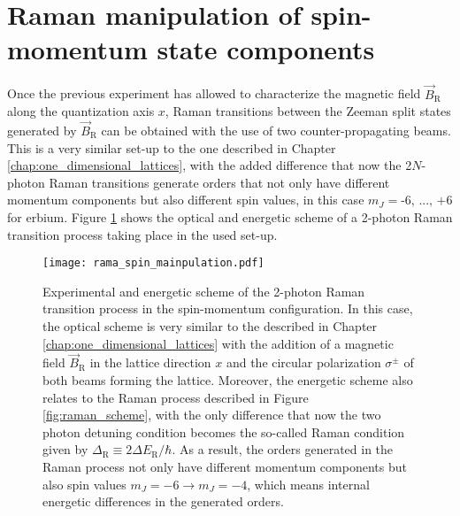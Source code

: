 \section{Raman manipulation of spin-momentum state components}\label{sec:raman_manipulation_theory}

Once the previous experiment has allowed to characterize the magnetic field $\vec{B}_{\text{R}}$ along the quantization axis $x$, Raman transitions between the Zeeman split states generated by $\vec{B}_{\text{R}}$ can be obtained with the use of two counter-propagating beams. This is a very similar set-up to the one described in Chapter \ref{chap:one_dimensional_lattices}, with the added difference that now the 2$N$-photon Raman transitions generate orders that not only have different momentum components but also different spin values, in this case $m_J = \text{-6, ..., +6}$ for erbium. Figure \ref{fig:raman_manipulation} shows the optical and energetic scheme of a 2-photon Raman transition process taking place in the used set-up.

\begin{figure}[!htbp]\centering
	\texttt{[image: rama\_spin\_mainpulation.pdf]}
	\caption[Experimental and energetic scheme of the 2-photon Raman transition process in the spin-momentum configuration]{Experimental and energetic scheme of the 2-photon Raman transition process in the spin-momentum configuration. In this case, the optical scheme is very similar to the described in Chapter \ref{chap:one_dimensional_lattices} with the addition of a magnetic field $\vec{B}_\text{R}$ in the lattice direction $x$ and the circular polarization $\sigma^\pm$ of both beams forming the lattice. Moreover, the energetic scheme also relates to the Raman process described in Figure \ref{fig:raman_scheme}, with the only difference that now the two photon detuning condition becomes the so-called Raman condition given by $\Delta_\text{R} \equiv 2\Delta E_\text{R}/\hbar$. As a result, the orders generated in the Raman process not only have different momentum components but also spin values  $m_{J}=-6 \rightarrow m_{J}=-4$, which means internal energetic differences in the generated orders. }\label{fig:raman_manipulation}
\end{figure}

\pagebreak

